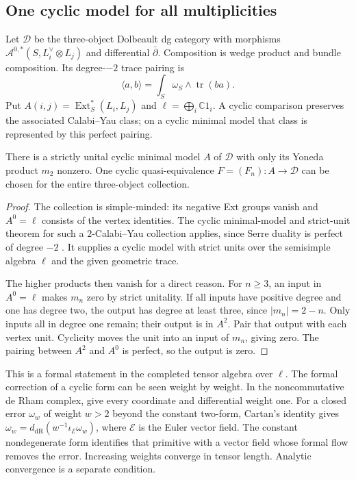\subsection{One cyclic model for all multiplicities}

Let $\mathcal D$ be the three-object Dolbeault dg category
with morphisms
$\mathcal A^{0,*}(S,L_i^\vee\otimes L_j)$ and differential
$\bar\partial$. Composition is wedge product and bundle
composition. Its degree-$-2$ trace pairing is
\[
 \langle a,b\rangle=\int_S\omega_S\wedge\operatorname{tr}(ba).
\]
Put $A(i,j)=\operatorname{Ext}^*_S(L_i,L_j)$ and
$\ell=\bigoplus_i\mathbb C1_i$.
A cyclic comparison preserves the associated Calabi--Yau
class; on a cyclic minimal model that class is represented
by this perfect pairing.

\begin{proposition}\label{cycompact:prop:cyclic-formality}
There is a strictly unital cyclic minimal model $A$ of
$\mathcal D$ with only its Yoneda product $m_2$ nonzero.
One cyclic quasi-equivalence $F=(F_n):A\to\mathcal D$
can be chosen for the entire three-object collection.
\end{proposition}

\begin{proof}
The collection is simple-minded: its negative Ext groups
vanish and $A^0=\ell$ consists of the vertex identities.
The cyclic minimal-model and strict-unit theorem for such
a $2$-Calabi--Yau collection applies, since Serre
duality is perfect of degree $-2$
\cite[Lemmas 4.4--4.5 and Proposition 4.8]{cycompact:DavisonPurity}.
It supplies a cyclic model with strict units over the
semisimple algebra $\ell$ and the given geometric trace.

The higher products then vanish for a direct reason.
For $n\geq3$, an input in $A^0=\ell$ makes $m_n$ zero
by strict unitality. If all inputs have positive degree
and one has degree two, the output has degree at least
three, since $|m_n|=2-n$. Only inputs all in degree one
remain; their output is in $A^2$. Pair that output with
each vertex unit. Cyclicity moves the unit into an input
of $m_n$, giving zero. The pairing between $A^2$ and
$A^0$ is perfect, so the output is zero.
\end{proof}

This is a formal statement in the completed tensor algebra
over $\ell$. The formal correction of a cyclic form can
be seen weight by weight. In the noncommutative de Rham
complex, give every coordinate and differential weight
one. For a closed error $\omega_w$ of weight $w>2$ beyond
the constant two-form,
Cartan's identity gives
$\omega_w=d_{\mathrm{dR}}(w^{-1}\iota_{\mathcal E}\omega_w)$,
where $\mathcal E$ is the Euler vector field.
The constant nondegenerate form identifies that primitive
with a vector field whose formal flow removes the error.
Increasing weights converge in tensor length. Analytic
convergence is a separate condition.

